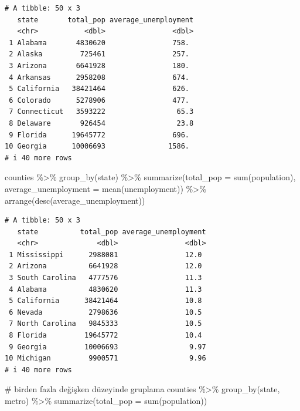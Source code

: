 \documentclass[
  letterpaper,
  DIV=11,
  numbers=noendperiod]{scrreprt}
\newenvironment{Shaded}{\begin{snugshade}}{\end{snugshade}}
\newcommand{\AttributeTok}[1]{\textcolor[rgb]{0.40,0.45,0.13}{#1}}
\newcommand{\CommentTok}[1]{\textcolor[rgb]{0.37,0.37,0.37}{#1}}
\newcommand{\FunctionTok}[1]{\textcolor[rgb]{0.28,0.35,0.67}{#1}}
\newcommand{\NormalTok}[1]{\textcolor[rgb]{0.00,0.23,0.31}{#1}}
\newcommand{\SpecialCharTok}[1]{\textcolor[rgb]{0.37,0.37,0.37}{#1}}
\begin{document}
\begin{verbatim}
# A tibble: 50 x 3
   state       total_pop average_unemployment
   <chr>           <dbl>                <dbl>
 1 Alabama       4830620                758. 
 2 Alaska         725461                257. 
 3 Arizona       6641928                180. 
 4 Arkansas      2958208                674. 
 5 California   38421464                626. 
 6 Colorado      5278906                477. 
 7 Connecticut   3593222                 65.3
 8 Delaware       926454                 23.8
 9 Florida      19645772                696. 
10 Georgia      10006693               1586. 
# i 40 more rows
\end{verbatim}

\begin{Shaded}
\begin{Highlighting}[]
\NormalTok{counties }\SpecialCharTok{\%\textgreater{}\%}
\FunctionTok{group\_by}\NormalTok{(state) }\SpecialCharTok{\%\textgreater{}\%}
\FunctionTok{summarize}\NormalTok{(}\AttributeTok{total\_pop =} \FunctionTok{sum}\NormalTok{(population),}
\AttributeTok{average\_unemployment =} \FunctionTok{mean}\NormalTok{(unemployment)) }\SpecialCharTok{\%\textgreater{}\%}
\FunctionTok{arrange}\NormalTok{(}\FunctionTok{desc}\NormalTok{(average\_unemployment))}
\end{Highlighting}
\end{Shaded}

\begin{verbatim}
# A tibble: 50 x 3
   state          total_pop average_unemployment
   <chr>              <dbl>                <dbl>
 1 Mississippi      2988081                12.0 
 2 Arizona          6641928                12.0 
 3 South Carolina   4777576                11.3 
 4 Alabama          4830620                11.3 
 5 California      38421464                10.8 
 6 Nevada           2798636                10.5 
 7 North Carolina   9845333                10.5 
 8 Florida         19645772                10.4 
 9 Georgia         10006693                 9.97
10 Michigan         9900571                 9.96
# i 40 more rows
\end{verbatim}

\begin{Shaded}
\begin{Highlighting}[]
\CommentTok{\# birden fazla değişken düzeyinde gruplama}
\NormalTok{counties }\SpecialCharTok{\%\textgreater{}\%}
\FunctionTok{group\_by}\NormalTok{(state, metro) }\SpecialCharTok{\%\textgreater{}\%}
\FunctionTok{summarize}\NormalTok{(}\AttributeTok{total\_pop =} \FunctionTok{sum}\NormalTok{(population))}
\end{Highlighting}
\end{Shaded}
\end{document}
